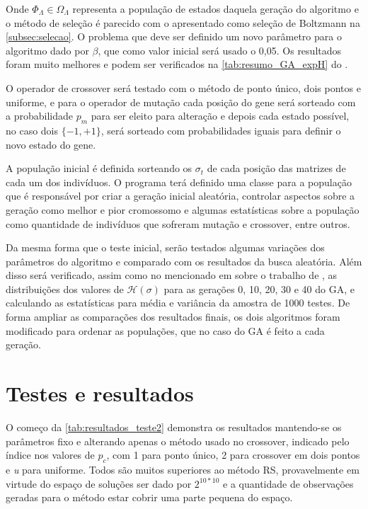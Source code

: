 Onde \(\Phi_{\Lambda} \in \Omega_{\Lambda} \) representa a população de estados daquela geração do algoritmo e o método de seleção é parecido com o apresentado como seleção de Boltzmann na \autoref{subsec:selecao}. O problema que deve ser definido um novo parâmetro para o algoritmo dado por \(\beta \), que como valor inicial será usado o 0,05. Os resultados foram muito melhores e podem ser verificados na \autoref{tab:resumo_GA_expH} do .

O operador de crossover será testado com o método de ponto único, dois pontos e uniforme, e para o operador de mutação cada posição do gene será sorteado com a probabilidade \(p_m\) para ser eleito para alteração e depois cada estado possível, no caso dois \(\{ -1, +1\}\), será sorteado com probabilidades iguais para definir o novo estado do gene.

A população inicial é definida sorteando os \(\sigma_t\) de cada posição das matrizes de cada um dos indivíduos. O programa terá definido uma classe para a população que é responsável por criar a geração inicial aleatória, controlar aspectos sobre a geração como melhor e pior cromossomo e algumas estatísticas sobre a população como quantidade de indivíduos que sofreram mutação e crossover, entre outros. 

Da mesma forma que o teste inicial, serão testados algumas variações dos parâmetros do algoritmo e comparado com os resultados da busca aleatória. Além disso será verificado, assim como no mencionado em  sobre o trabalho de , as distribuições dos valores de \(\mathcal{H}(\sigma)\) para as gerações 0, 10, 20, 30 e 40 do GA, e calculando as estatísticas para média e variância da amostra de 1000 testes. De forma ampliar as comparações dos resultados finais, os dois algoritmos foram modificado para ordenar as populações, que no caso do GA é feito a cada geração.

\section{Testes e resultados}
O começo da \autoref{tab:resultados_teste2} demonstra os resultados mantendo-se os parâmetros fixo e alterando apenas o método usado no crossover, indicado pelo índice nos valores de \(p_c\), com 1 para ponto único, 2 para crossover em dois pontos e \textit{u} para uniforme. Todos são muitos superiores ao método RS, provavelmente em virtude do espaço de soluções ser dado por \(2^{10*10}\) e a quantidade de observações geradas para o método estar cobrir uma parte pequena do espaço. 

